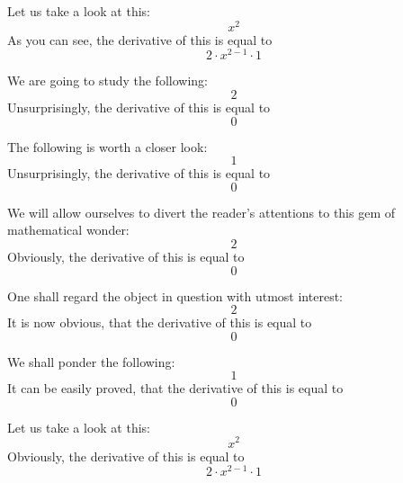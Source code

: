 \documentclass{article}
\begin{document}
Let us take a look at this:
\begin{equation}
x ^{2 } 
\end{equation}
As you can see, the derivative of this is equal to
\begin{equation}
2 \cdot x ^{2 - 1 } \cdot 1 
\end{equation}

We are going to study the following:
\begin{equation}
2 
\end{equation}
Unsurprisingly, the derivative of this is equal to
\begin{equation}
0 
\end{equation}

The following is worth a closer look:
\begin{equation}
1 
\end{equation}
Unsurprisingly, the derivative of this is equal to
\begin{equation}
0 
\end{equation}

We will allow ourselves to divert the reader's attentions to this gem of mathematical wonder:
\begin{equation}
2 
\end{equation}
Obviously, the derivative of this is equal to
\begin{equation}
0 
\end{equation}

One shall regard the object in question with utmost interest:
\begin{equation}
2 
\end{equation}
It is now obvious, that the derivative of this is equal to
\begin{equation}
0 
\end{equation}

We shall ponder the following:
\begin{equation}
1 
\end{equation}
It can be easily proved, that the derivative of this is equal to
\begin{equation}
0 
\end{equation}

Let us take a look at this:
\begin{equation}
x ^{2 } 
\end{equation}
Obviously, the derivative of this is equal to
\begin{equation}
2 \cdot x ^{2 - 1 } \cdot 1 
\end{equation}
\end{document}
